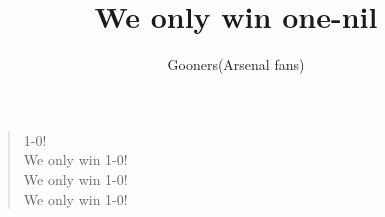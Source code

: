 \documentclass[a4paper,12pt]{article}
\title{We only win one-nil}
\author{Gooners(Arsenal fans)}
\date{}
\begin{document}
	
	\maketitle
	
	\begin{verse}
		
		1-0! \\
		We only win 1-0! \\
		We only win 1-0! \\
		We only win 1-0!
		
	\end{verse}
	
\end{document}
